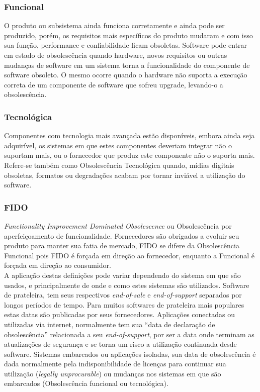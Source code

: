 \subsubsection{\esp Funcional}
	
O produto ou subsistema ainda funciona corretamente e ainda pode ser produzido, porém, os requisitos mais específicos do produto mudaram e com isso sua função, performance e confiabilidade ficam obsoletas. Software pode entrar em estado de obsolescência quando hardware, novos requisitos ou outras mudanças de software em um sistema torna a funcionalidade do componente de software obsoleto. O mesmo ocorre quando o hardware não suporta a execução correta de um componente de software que sofreu upgrade, levando-o a obsolescência.

\subsubsection{\esp Tecnológica}
	
Componentes com tecnologia mais avançada estão disponíveis, embora ainda seja adquirível, os sistemas em que estes componentes deveriam integrar não o suportam mais, ou o fornecedor que produz este componente não o suporta mais. Refere-se também como Obsolescência Tecnológica quando, mídias digitais obsoletas, formatos ou degradações acabam por tornar inviável a utilização do software.

\subsubsection{\esp FIDO}
	
\textit{Functionality Improvement Dominated Obsolescence} ou Obsolescência por aperfeiçoamento de funcionalidade. 
Fornecedores são obrigados a evoluir seu produto para manter sua fatia de mercado, FIDO se difere da Obsolescência Funcional pois FIDO é forçada em direção ao fornecedor, enquanto a Funcional é forçada em direção ao consumidor.
\\

A aplicação destas definições pode variar dependendo do sistema em que são usados, e principalmente de onde e como estes sistemas são utilizados. Software de prateleira, tem seus respectivos \textit{end-of-sale} e \textit{end-of-support} separados por longos períodos de tempo. Para muitos softwares de prateleira mais populares estas datas são publicadas por seus fornecedores. Aplicações conectadas ou utilizadas via internet, normalmente tem sua “data de declaração de obsolescência” relacionada a seu \textit{end-of-support}, por ser a data onde terminam as atualizações de segurança e se torna um risco a utilização continuada desde software. Sistemas embarcados ou aplicações isoladas, sua data de obsolescência é dada normalmente pela indisponibilidade de licenças para continuar sua utilização (\textit{legally unprocurable}) ou mudanças nos sistemas em que são embarcados (Obsolescência funcional ou tecnológica).

